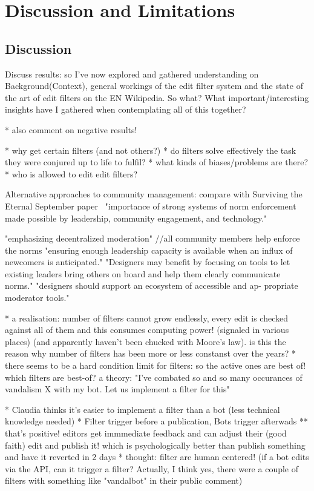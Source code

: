 \chapter{Discussion and Limitations}
\label{chap:discussion}

\section{Discussion}

Discuss results:
so I've now explored and gathered understanding on Background(Context), general workings of the edit filter system and the state of the art of edit filters on the EN Wikipedia.
So what? What important/interesting insights have I gathered when contemplating all of this together?

* also comment on negative results!

* why get certain filters (and not others?)
* do filters solve effectively the task they were conjured up to life to fulfil?
* what kinds of biases/problems are there?
* who is allowed to edit edit filters?

Alternative approaches to community management:
compare with Surviving the Eternal September paper~\cite{KieMonHill2016}
"importance of strong
systems of norm enforcement made possible by leadership,
community engagement, and technology."

"emphasizing decentralized moderation" //all community members help enforce the norms
"ensuring enough leadership capacity is available
when an influx of newcomers is anticipated."
"Designers may
benefit by focusing on tools to let existing leaders bring others
on board and help them clearly communicate norms."
"designers should support an ecosystem of accessible and ap-
propriate moderator tools."


* a realisation: number of filters cannot grow endlessly, every edit is checked against all of them and this consumes computing power! (signaled in various places) (and apparently haven't been chucked with Moore's law). is this the reason why number of filters has been more or less constanst over the years?
* there seems to be a hard condition limit for filters: so the active ones are best of! which filters are best-of? a theory: "I've combated so and so many occurances of vandalism X with my bot. Let us implement a filter for this"

* Claudia thinks it's easier to implement a filter than a bot (less technical knowledge needed)
* Filter trigger before a publication, Bots trigger afterwads
  ** that's positive! editors get immmediate feedback and can adjust their (good faith) edit and publish it! which is psychologically better than publish something and have it reverted in 2 days
* thought: filter are human centered! (if a bot edits via the API, can it trigger a filter? Actually, I think yes, there were a couple of filters with something like "vandalbot" in their public comment)


